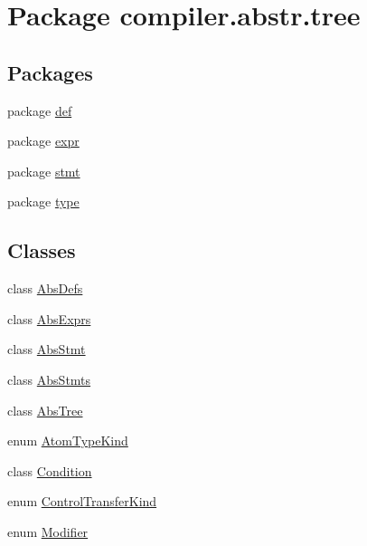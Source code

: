 \hypertarget{namespacecompiler_1_1abstr_1_1tree}{}\section{Package compiler.\+abstr.\+tree}
\label{namespacecompiler_1_1abstr_1_1tree}
\subsection*{Packages}
\begin{DoxyCompactItemize}
\item 
package \hyperlink{namespacecompiler_1_1abstr_1_1tree_1_1def}{def}
\item 
package \hyperlink{namespacecompiler_1_1abstr_1_1tree_1_1expr}{expr}
\item 
package \hyperlink{namespacecompiler_1_1abstr_1_1tree_1_1stmt}{stmt}
\item 
package \hyperlink{namespacecompiler_1_1abstr_1_1tree_1_1type}{type}
\end{DoxyCompactItemize}
\subsection*{Classes}
\begin{DoxyCompactItemize}
\item 
class \hyperlink{classcompiler_1_1abstr_1_1tree_1_1_abs_defs}{Abs\+Defs}
\item 
class \hyperlink{classcompiler_1_1abstr_1_1tree_1_1_abs_exprs}{Abs\+Exprs}
\item 
class \hyperlink{classcompiler_1_1abstr_1_1tree_1_1_abs_stmt}{Abs\+Stmt}
\item 
class \hyperlink{classcompiler_1_1abstr_1_1tree_1_1_abs_stmts}{Abs\+Stmts}
\item 
class \hyperlink{classcompiler_1_1abstr_1_1tree_1_1_abs_tree}{Abs\+Tree}
\item 
enum \hyperlink{enumcompiler_1_1abstr_1_1tree_1_1_atom_type_kind}{Atom\+Type\+Kind}
\item 
class \hyperlink{classcompiler_1_1abstr_1_1tree_1_1_condition}{Condition}
\item 
enum \hyperlink{enumcompiler_1_1abstr_1_1tree_1_1_control_transfer_kind}{Control\+Transfer\+Kind}
\item 
enum \hyperlink{enumcompiler_1_1abstr_1_1tree_1_1_modifier}{Modifier}
\end{DoxyCompactItemize}


